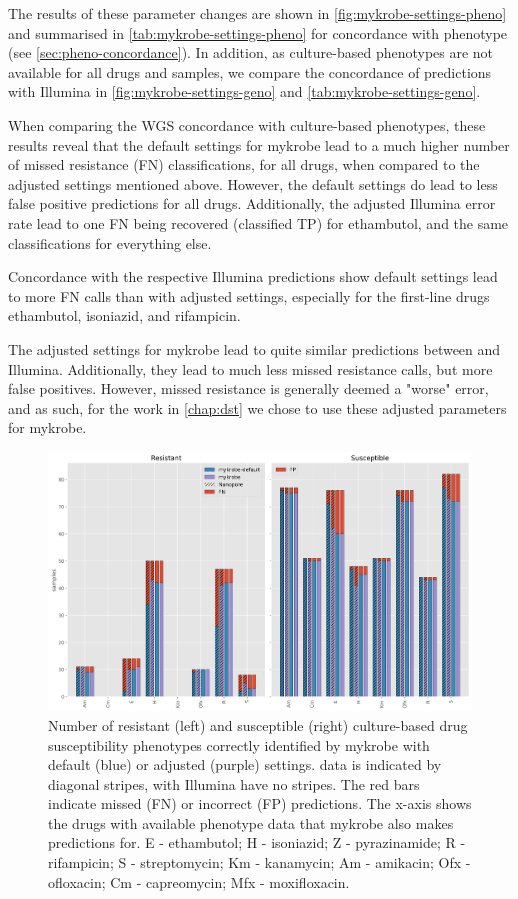 The results of these parameter changes are shown in \autoref{fig:mykrobe-settings-pheno} and summarised in \autoref{tab:mykrobe-settings-pheno} for concordance with phenotype (see \autoref{sec:pheno-concordance}). In addition, as culture-based phenotypes are not available for all drugs and samples, we compare the concordance of \ont{} predictions with Illumina in \autoref{fig:mykrobe-settings-geno} and \autoref{tab:mykrobe-settings-geno}.

When comparing the WGS concordance with culture-based phenotypes, these results reveal that the default \ont{} settings for mykrobe lead to a much higher number of missed resistance (FN) classifications, for all drugs, when compared to the adjusted settings mentioned above. However, the default settings do lead to less false positive predictions for all drugs. Additionally, the adjusted Illumina error rate lead to one FN being recovered (classified TP) for ethambutol, and the same classifications for everything else.

Concordance with the respective Illumina predictions show default settings lead to more FN calls than with adjusted settings, especially for the first-line drugs ethambutol, isoniazid, and rifampicin. 

The adjusted settings for mykrobe lead to quite similar predictions between \ont{} and Illumina. Additionally, they lead to much less \ont{} missed resistance calls, but more false positives. However, missed resistance is generally deemed a "worse" error, and as such, for the work in \autoref{chap:dst} we chose to use these adjusted parameters for mykrobe.

\begin{figure}
\begin{center}
\includegraphics[width=0.90\columnwidth]{Appendix2/Figs/mykrobe_settings_pheno.png}
\caption{{Number of resistant (left) and susceptible (right) culture-based drug susceptibility phenotypes correctly identified by mykrobe with default (blue) or adjusted (purple) settings. \ont{} data is indicated by diagonal stripes, with Illumina have no stripes. The red bars indicate missed (FN) or incorrect (FP) predictions. The x-axis shows the drugs with available phenotype data that mykrobe also makes predictions for. E - ethambutol; H - isoniazid; Z - pyrazinamide; R - rifampicin; S - streptomycin; Km - kanamycin; Am - amikacin; Ofx - ofloxacin; Cm - capreomycin; Mfx - moxifloxacin.
{\label{fig:mykrobe-settings-pheno}}
}}
\end{center}
\end{figure}


